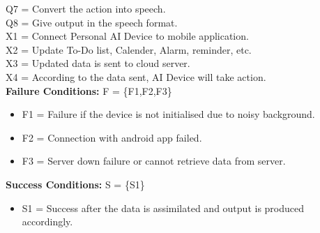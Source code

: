 \documentclass[12pt]{extreport}
\begin{document}
    \newline 
    Q7 = Convert the action into speech.\\
    \newline 
    Q8 = Give output in the speech format.\\
    \newline
    X1 = Connect Personal AI Device to mobile application.\\
    \newline
    X2 = Update To-Do list, Calender, Alarm, reminder, etc.\\
    \newline
    X3 = Updated data is sent to cloud server.\\
    \newline
    X4 = According to the data sent, AI Device will take action.\\
    \newline
\noindent 
\textbf{Failure Conditions:}  F = \{F1,F2,F3\}
\begin{itemize}
\item F1  = Failure if the device is not initialised due to noisy background.
\item F2 = Connection with android app failed.
\item F3 = Server down failure or cannot retrieve data from server.
\end{itemize}

\noindent
\textbf{Success Conditions:} S = \{S1\}
\begin{itemize}
\item S1 = Success after the data is assimilated and output is produced accordingly.\end{itemize}     
\end{document}
